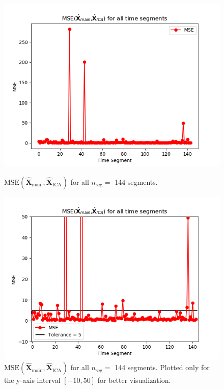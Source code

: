 \begin{figure}[H]
\begin{widepage}
    \begin{minipage}[t]{.45\textwidth}
		\centering
		\includegraphics[width=1\linewidth]{figures/ch_7/resultat/average_mse_none_removed_ica}
	\caption{$\text{MSE} \left(\hat{\mathbf{X}}_{\text{main}}, \hat{\mathbf{X}}_{\text{ICA}}\right)$ for all $n_{\text{seg}} = $ 144 segments.}
	\label{fig:M=N_1}
    \end{minipage} 
    \hspace{0.5cm}
    \begin{minipage}[t]{.45\textwidth}
        \centering
		\includegraphics[width=1\linewidth]{figures/ch_7/resultat/average_mse_none_removed_ica_zoom.png}
	\caption{$\text{MSE} \left(\hat{\mathbf{X}}_{\text{main}}, \hat{\mathbf{X}}_{\text{ICA}}\right)$ for all $n_{\text{seg}} = $ 144 segments. Plotted only for the y-axis interval $[-10, 50]$ for better visualization.}
	\label{fig:M=N_1_2}
    \end{minipage}
\end{widepage}
\end{figure}
